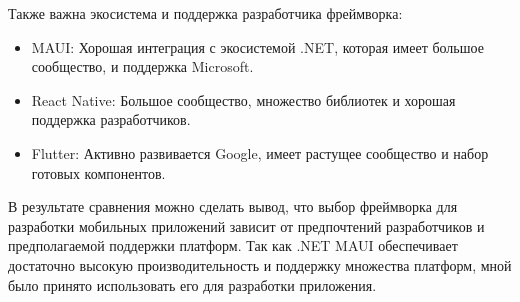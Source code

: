 Также важна экосистема и поддержка разработчика фреймворка:
\begin{itemize}
        \item MAUI: Хорошая интеграция с экосистемой .NET, которая имеет большое сообщество, и поддержка Microsoft.
        \item React Native: Большое сообщество, множество библиотек и хорошая поддержка разработчиков.
        \item Flutter: Активно развивается Google, имеет растущее сообщество и набор готовых компонентов.
    \end{itemize}

В результате сравнения можно сделать вывод, что выбор фреймворка для разработки мобильных приложений зависит от предпочтений разработчиков и предполагаемой поддержки платформ. Так как .NET MAUI обеспечивает достаточно высокую производительность и поддержку множества платформ, мной было принято использовать его для разработки приложения.